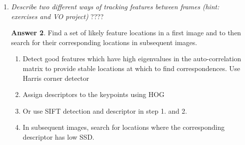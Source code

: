 \documentclass[a4paper,12 pt]{article}
\theoremstyle{definition}
\theoremstyle{remark}
\theoremstyle{definition}
\theoremstyle{definition}
\theoremstyle{definition}
\theoremstyle{definition}
\theoremstyle{remark}
\theoremstyle{remark}
\theoremstyle{definition}
\theoremstyle{definition}
\newtheorem*{answer}{Answer}
\begin{document}
\begin{enumerate}
\begin{answer}
\begin{figure}[h!]
\begin{center}
\caption{Recap for detectors and descriptors \label{recap}}
\end{center}
\end{figure}
\end{answer}
\item \textit{Describe two different ways of tracking features between frames (hint: exercises and VO project)} ????
\begin{answer}
Find a set of likely feature locations in a first image and to then search for their corresponding locations in subsequent images. 
\begin{enumerate}
\item Detect good features which have high eigenvalues in the auto-correlation matrix to provide stable locations at which to find correspondences. Use Harris corner detector 
\item Assign descriptors to the keypoints using HOG
\item Or use SIFT detection and descriptor in step 1. and 2. 
\item In subsequent images, search for locations where the corresponding descriptor has low SSD.
\end{enumerate}
\end{answer}
\end{enumerate}
\newpage
\end{document}
